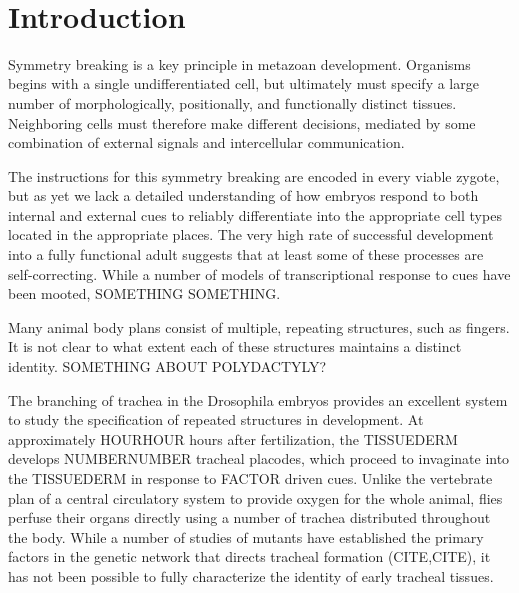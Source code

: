 \documentclass{proposal}
\begin{document}
\ \\


\renewcommand{\thepage} {B--\arabic{page}}

\newpage


\renewcommand{\thepage} {D--\arabic{page}}

\newpage



\section{Introduction}


Symmetry breaking is a key principle in metazoan development.  Organisms begins with a single undifferentiated cell, but ultimately must specify a large number of morphologically, positionally, and functionally distinct tissues. Neighboring cells must therefore make different decisions, mediated by some combination of external signals and intercellular communication.

The instructions for this symmetry breaking are encoded in every viable zygote, but as yet we lack a detailed understanding of how embryos respond to both internal and external cues to reliably differentiate into the appropriate cell types located in the appropriate places.  The very high rate of successful development into a fully functional adult suggests that at least some of these processes are self-correcting. While a number of models of transcriptional response to cues have been mooted, SOMETHING SOMETHING. 

Many animal body plans consist of multiple, repeating structures, such as fingers.  It is not clear to what extent each of these structures maintains a distinct identity.   SOMETHING ABOUT POLYDACTYLY? 

The branching of trachea in the Drosophila embryos provides an excellent system  to study the specification of repeated structures in development.  At approximately HOURHOUR hours after fertilization, the TISSUEDERM develops NUMBERNUMBER tracheal placodes, which proceed to invaginate into the TISSUEDERM in response to FACTOR driven cues.  Unlike the vertebrate plan of a central circulatory system to provide oxygen for the whole animal, flies perfuse their organs directly using a number of trachea distributed throughout the body. While a number of studies of mutants have established the primary factors in the genetic network that directs tracheal formation (CITE,CITE), it has not been possible to fully characterize the identity of early tracheal tissues. 
\end{document}
